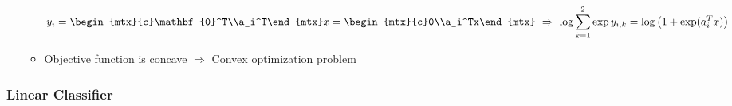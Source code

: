 \begin{itemize}
\begin{itemize}
        \begin{equation}
            y_i=\begin{mtx}{c}\mathbf{0}^T\\a_i^T\end{mtx}x=\begin{mtx}{c}0\\a_i^Tx\end{mtx}~\Rightarrow~\log\sum_{k=1}^2\exp y_{i,k}=\log\left(1+\exp(a_i^Tx)\right)
        \end{equation}
        \item Objective function is concave $\Rightarrow$ Convex optimization problem
    \end{itemize}
\end{itemize}

\subsubsection*{Linear Classifier}
